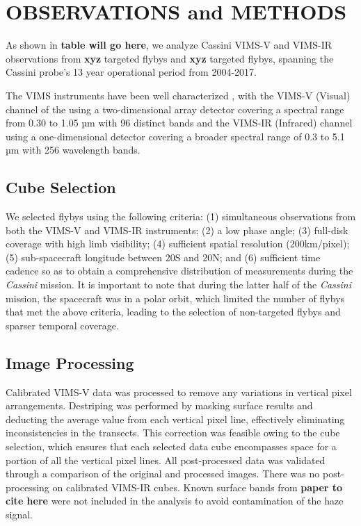 \documentclass[tighten,linenumbers,twocolumn]{aastex631}
\begin{document}
\section{OBSERVATIONS and METHODS}
As shown in \textbf{table will go here}, we analyze Cassini VIMS-V and VIMS-IR observations from \textbf{xyz} targeted flybys and \textbf{xyz} targeted flybys, spanning the Cassini probe's 13 year operational period from 2004-2017. 

The VIMS instruments have been well characterized \cite{brown2004cassini}, with the VIMS-V (Visual) channel of the using a two-dimensional array detector covering a spectral range from 0.30 to 1.05 µm with 96 distinct bands and the VIMS-IR (Infrared) channel using a one-dimensional detector covering a broader spectral range of 0.3 to 5.1 µm with 256 wavelength bands.
\subsection{Cube Selection}

We selected flybys using the following criteria: (1) simultaneous observations from both the VIMS-V and VIMS-IR instruments; (2) a low phase angle; (3) full-disk coverage with high limb visibility; (4) sufficient spatial resolution (200km/pixel); (5) sub-spacecraft longitude between 20\textdegree{}S and 20\textdegree{}N; and (6) sufficient time cadence so as to obtain a comprehensive distribution of measurements during the \textit{Cassini} mission. It is important to note that during the latter half of the \textit{Cassini} mission, the spacecraft was in a polar orbit, which limited the number of flybys that met the above criteria, leading to the selection of non-targeted flybys and sparser temporal coverage.

\subsection{Image Processing}
\label{sec: image processing}

Calibrated VIMS-V data was processed to remove any variations in vertical pixel arrangements. Destriping was performed by masking surface results and deducting the average value from each vertical pixel line, effectively eliminating inconsistencies in the transects. This correction was feasible owing to the cube selection, which ensures that each selected data cube encompasses space for a portion of all the vertical pixel lines. All post-processed data was validated through a comparison of the original and processed images. There was no post-processing on calibrated VIMS-IR cubes. Known surface bands from \textbf{paper to cite here} were not included in the analysis to avoid contamination of the haze signal.
\end{document}
